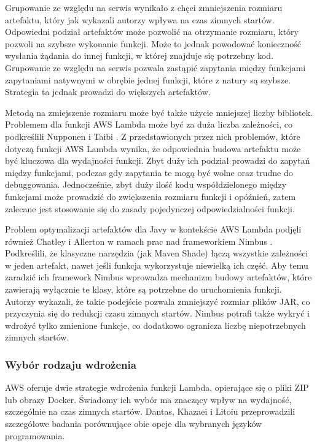 Grupowanie ze względu na serwis wynikało z chęci zmniejszenia rozmiaru artefaktu, który jak wykazali autorzy wpływa na czas zimnych startów. 
Odpowiedni podział artefaktów może pozwolić na otrzymanie rozmiaru, który pozwoli na szybsze wykonanie funkcji. Może to jednak powodować konieczność wysłania żądania do innej funkcji, w której znajduje się potrzebny kod.
Grupowanie ze względu na serwis pozwala zastąpić zapytania między funkcjami zapytaniami natywnymi w obrębie jednej funkcji, które z natury są szybsze. Strategia ta jednak prowadzi do większych artefaktów.

Metodą na zmiejszenie rozmiaru może być także użycie mniejszej liczby bibliotek. Problemem dla funkcji AWS Lambda może być za duża liczba zależności, co podkreślili Nupponen i Taibi \cite{9095731}.
Z przedstawionych przez nich problemów, które dotyczą funkcji AWS Lambda wynika, że odpowiednia budowa artefaktu może być kluczowa dla wydajności funkcji. 
Zbyt duży ich podział prowadzi do zapytań między funkcjami, podczas gdy zapytania te mogą być wolne oraz trudne do debuggowania. 
Jednocześnie, zbyt duży ilość kodu współdzielonego między funkcjami może prowadzić do zwiększenia rozmiaru funkcji i opóźnień, zatem zalecane jest stosowanie się do zasady pojedynczej odpowiedzialności funkcji. 

Problem optymalizacji artefaktów dla Javy w kontekście AWS Lambda podjęli również Chatley i Allerton w ramach prac nad frameworkiem Nimbus \cite{10.1145/3377812.3382135}.
Podkreślili, że klasyczne narzędzia (jak Maven Shade) łączą wszystkie zależności w jeden artefakt, nawet jeśli funkcja wykorzystuje niewielką ich część.
Aby temu zaradzić ich framework Nimbus wprowadza mechanizm budowy artefaktów, które zawierają wyłącznie te klasy, które są potrzebne do uruchomienia funkcji.
Autorzy wykazali, że takie podejście pozwala zmniejszyć rozmiar plików JAR, co przyczynia się do redukcji czasu zimnych startów. 
Nimbus potrafi także wykryć i wdrożyć tylko zmienione funkcje, co dodatkowo ogranicza liczbę niepotrzebnych zimnych startów.

\subsubsection*{Wybór rodzaju wdrożenia}

AWS oferuje dwie strategie wdrożenia funkcji Lambda, opierające się o pliki ZIP lub obrazy Docker. 
Świadomy ich wybór ma znaczący wpływ na wydajność, szczególnie na czas zimnych startów.
Dantas, Khazaei i Litoiu \cite{9860368} przeprowadzili szczegółowe badania porównujące obie opcje dla wybranych języków programowania.

